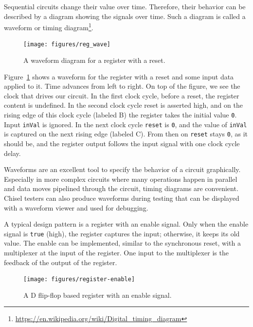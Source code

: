 \documentclass[%
    10pt,
    headinclude, footexclude,
    openright, %
    notitlepage,
    cleardoubleempty,
    headsepline,
    pointlessnumbers,
    bibtotoc, idxtotoc,
    ]{scrbook}
\newcommand{\code}[1]{{\small{\texttt{#1}}}}
\newcommand{\todo}[1]{{\emph{TODO: #1}}}
\newcommand{\myref}[2]{\href{#1}{#2}}
\renewcommand{\myref}[2]{{#2}{\footnote{\url{#1}}}}
\renewcommand{\todo}[1]{}
\begin{document}
Sequential circuits change their value over time. Therefore, their behavior can be described
by a diagram showing the signals over time. Such a diagram is called a waveform or
\myref{https://en.wikipedia.org/wiki/Digital_timing_diagram}{timing diagram}.


\todo{from Luca: Do readers know about timing diagrams?}

\begin{figure}
  \centering
  \texttt{[image: figures/reg\_wave]}
  \caption{A waveform diagram for a register with a reset.}
  \label{fig:register-wave}
\end{figure}

Figure~\ref{fig:register-wave} shows a waveform for the register with a reset
and some input data applied to it.
Time advances from left to right. On top of the figure, we see the clock that drives our circuit.
In the first clock cycle, before a reset, the register content is undefined. In the second clock cycle reset
is asserted high, and on the rising edge of this clock cycle (labeled B) the register
takes the initial value \code{0}. Input \code{inVal} is ignored. In the next clock cycle
\code{reset} is \code{0}, and the value of \code{inVal} is captured on the next rising
edge (labeled C). From then on \code{reset} stays \code{0}, as it should be, and the
register output follows the input signal with one clock cycle delay.

Waveforms are an excellent tool to specify the behavior of a circuit graphically.
Especially in more complex circuits where many operations happen in parallel
and data moves pipelined through the circuit, timing diagrams are convenient.
Chisel testers can also produce waveforms during testing that can be displayed
with a waveform viewer and used for debugging.

A typical design pattern is a register with an enable signal. Only when the enable signal
is \code{true} (high), the register captures the input; otherwise, it keeps its old value.
The enable can be implemented, similar to the synchronous reset, with
a multiplexer at the input of the register. One input to the multiplexer is the feedback of the
output of the register.

\begin{figure}
  \centering
  \texttt{[image: figures/register-enable]}
  \caption{A D flip-flop based register with an enable signal.}
  \label{fig:register-enable}
\end{figure}
\end{document}

